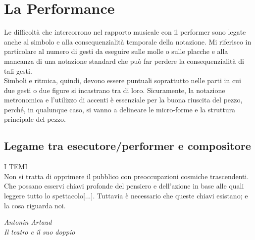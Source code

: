 
\chapter{La Performance}
\label{chp:La Performance}

Le difficoltà che intercorrono nel rapporto musicale con il performer sono legate anche al simbolo e alla consequenzialità temporale della notazione. Mi riferisco in particolare al numero di gesti da eseguire sulle molle o sulle placche e alla mancanza di una notazione standard che può far perdere la consequenzialità di tali gesti. \\
Simboli e ritmica, quindi, devono essere puntuali soprattutto nelle parti in cui due gesti o due figure si incastrano tra di loro. Sicuramente, la notazione metronomica e l'utilizzo di accenti è essenziale per la buona riuscita del pezzo, perché, in qualunque caso, si vanno a delineare le micro-forme e la struttura principale del pezzo.

\section{Legame tra esecutore/performer e compositore}


\epigraph{I TEMI \\ Non si tratta di opprimere il pubblico con preoccupazioni cosmiche trascendenti. Che possano esservi chiavi profonde del pensiero e dell'azione in base alle quali leggere tutto lo spettacolo[...]. Tuttavia è necessario che queste chiavi esistano; e la cosa riguarda noi.}{\textit{Antonin Artaud \\ Il teatro e il suo doppio}}

